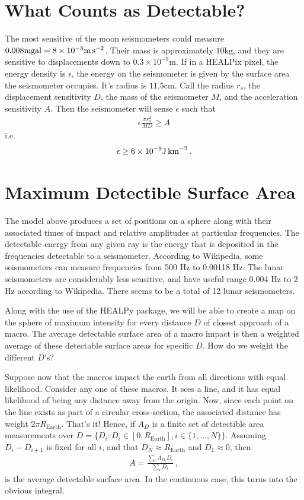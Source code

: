 \documentclass{article}
\newcommand*\te[1]{\text{#1}}
\newcommand*\f[2]{\frac{#1}{#2}}
\begin{document}
\section{What Counts as Detectable?}
The most sensitive of the moon seismometers could measure $0.008\te{mgal}=8\times 10^{-8}\te{m\,s}^{-2}$. Their mass is approximately $10\te{kg}$, and they are sensitive to displacements down to $0.3\times 10^{-9}\te{m}$. If in a HEALPix pixel, the energy density is $\epsilon$, the energy on the seismometer is given by the surface area the seismometer occupies. It's radius is $11.5\te{cm}$. Call the radius $r_s$, the displacement sensitivity $D$, the mass of the seismometer $M$, and the acceleration sensitivity $A$. Then the seismometer will sense $\epsilon$ such that
\begin{align}
\epsilon\f{\pi r_s^2}{MD} \geq A
\end{align}
i.e.
\begin{align}
\epsilon \geq 6\times 10^{-9} \te{J\,km}^{-2}\,.
\end{align}
\pagebreak
\section{Maximum Detectible Surface Area}
\indent

The model above produces a set of positions on a sphere along with their associated times of impact and relative amplitudes at particular frequencies. The detectable energy from any given ray is the energy that is depositied in the frequencies detectable to a seismometer. According to Wikipedia, some seismometers can measure frequencies from 500 Hz to 0.00118 Hz. The lunar seismometers are considerably less sensitive, and have useful range 0.004 Hz to 2 Hz according to Wikipedia. There seems to be a total of 12 lunar seismometers.

Along with the use of the HEALPy package, we will be able to create a map on the sphere of maximum intensity for every distance $D$ of closest approach of a macro. The average detectable surface area of a macro impact is then a weighted average of these detectable surface areas for specific $D$. How do we weight the different $D$'s?

Suppose now that the macros impact the earth from all directions with equal likelihood. Consider any one of these macros. It sees a line, and it has equal likelihood of being any distance away from the origin. Now, since each point on the line exists as part of a circular cross-section, the associated distance has weight $2\pi R_{\te{Earth}}$. That's it! Hence, if $A_D$ is a finite set of detectible area measurements over $D = \{D_i:D_i\in[0,R_\te{Earth}],i\in\{1,\dots,N\}\}$. Assuming $D_i - D_{i+1}$ is fixed for all $i$, and that $D_N\approx R_{\te{Earth}}$ and $D_1 \approx 0$, then 
\begin{align}
A=\f{\sum_i A_{D_i}D_i}{\sum_i D_i}\,,
\end{align}
is the average detectable surface area. In the continuous case, this turns into the obvious integral.
\end{document}
